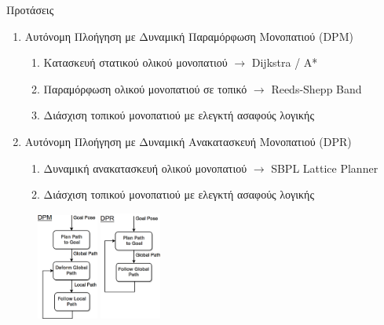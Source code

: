 \documentclass[10pt, compress, handout]{beamer} %
\begin{document}
\begin{frame}{Προτάσεις}
	\begin{enumerate}
		\item Αυτόνομη Πλοήγηση με Δυναμική Παραμόρφωση Μονοπατιού (DPM)
		\vspace{-0.5cm}
		\begin{enumerate}
			\item Κατασκευή στατικού ολικού μονοπατιού $\rightarrow$ Dijkstra / A*
			\item Παραμόρφωση ολικού μονοπατιού σε τοπικό $\rightarrow$ Reeds-Shepp Band
			\item Διάσχιση τοπικού μονοπατιού με ελεγκτή ασαφούς λογικής
		\end{enumerate}
		\item Αυτόνομη Πλοήγηση με Δυναμική Ανακατασκευή Μονοπατιού (DPR)
		\begin{enumerate}
			\item Δυναμική ανακατασκευή ολικού μονοπατιού $\rightarrow$ SBPL Lattice Planner
			\item Διάσχιση τοπικού μονοπατιού με ελεγκτή ασαφούς λογικής
		\end{enumerate}
		
	\end{enumerate}
	\begin{figure}
		\centering
		\includegraphics[width=2cm]{Figures/dpm.png}
		\hspace{2cm}
		\includegraphics[width=2cm]{Figures/dpr.png}
	\end{figure}
\end{frame}
\end{document}

